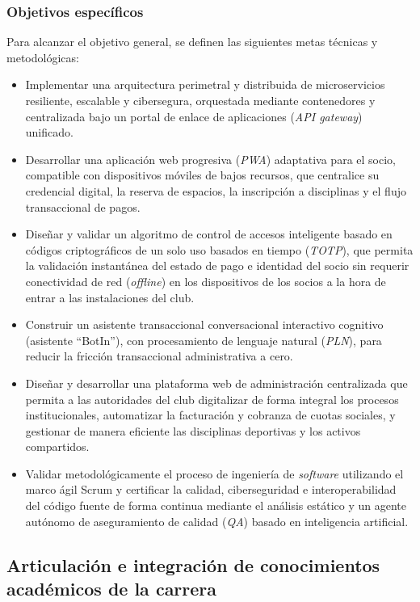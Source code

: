 \subsubsection{Objetivos específicos}
Para alcanzar el objetivo general, se definen las siguientes metas técnicas y metodológicas:
\begin{itemize}
    \item Implementar una arquitectura perimetral y distribuida de microservicios resiliente, escalable y cibersegura, orquestada mediante contenedores y centralizada bajo un portal de enlace de aplicaciones (\textit{API gateway}) unificado.
    \item Desarrollar una aplicación web progresiva (\textit{PWA}) adaptativa para el socio, compatible con dispositivos móviles de bajos recursos, que centralice su credencial digital, la reserva de espacios, la inscripción a disciplinas y el flujo transaccional de pagos.
    \item Diseñar y validar un algoritmo de control de accesos inteligente basado en códigos criptográficos de un solo uso basados en tiempo (\textit{TOTP}), que permita la validación instantánea del estado de pago e identidad del socio sin requerir conectividad de red (\textit{offline}) en los dispositivos de los socios a la hora de entrar a las instalaciones del club.
    \item Construir un asistente transaccional conversacional interactivo cognitivo (asistente ``BotIn''), con procesamiento de lenguaje natural (\textit{PLN}), para reducir la fricción transaccional administrativa a cero.
    \item Diseñar y desarrollar una plataforma web de administración centralizada que permita a las autoridades del club digitalizar de forma integral los procesos institucionales, automatizar la facturación y cobranza de cuotas sociales, y gestionar de manera eficiente las disciplinas deportivas y los activos compartidos.
    \item Validar metodológicamente el proceso de ingeniería de \textit{software} utilizando el marco ágil Scrum y certificar la calidad, ciberseguridad e interoperabilidad del código fuente de forma continua mediante el análisis estático y un agente autónomo de aseguramiento de calidad (\textit{QA}) basado en inteligencia artificial.
\end{itemize}

\subsection{Articulación e integración de conocimientos académicos de la carrera}

